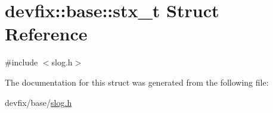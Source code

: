 \hypertarget{structdevfix_1_1base_1_1stx__t}{}\section{devfix\+:\+:base\+:\+:stx\+\_\+t Struct Reference}
\label{structdevfix_1_1base_1_1stx__t}


{\ttfamily \#include $<$slog.\+h$>$}



The documentation for this struct was generated from the following file\+:\begin{DoxyCompactItemize}
\item 
devfix/base/\hyperlink{slog_8h}{slog.\+h}\end{DoxyCompactItemize}
